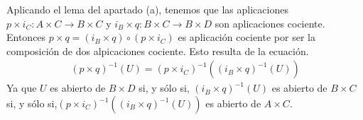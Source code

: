 \documentclass{article}
\begin{document}
Aplicando el lema del apartado (a), tenemos que las aplicaciones $p\times i_C:A\times C\rightarrow B\times C$ y $i_B\times q: B\times C\rightarrow B\times D$ son aplicaciones cociente. Entonces $p\times q = (i_B\times q) \circ (p\times i_C)$ es aplicación cociente por ser la composición de dos alpicaciones cociente. Esto resulta de la ecuación.
\begin{eqnarray}
(p\times q)^{-1}(U)= (p\times i_C)^{-1}((i_B\times q)^{-1}(U)) \nonumber
\end{eqnarray}
Ya que $U$ es abierto de $B\times D$ si, y sólo si, $(i_B\times q)^{-1}(U)$ es abierto de $B\times C$ si, y sólo si,$(p\times i_C)^{-1}((i_B\times q)^{-1}(U))$ es abierto de $A\times C$.
\end{document}
